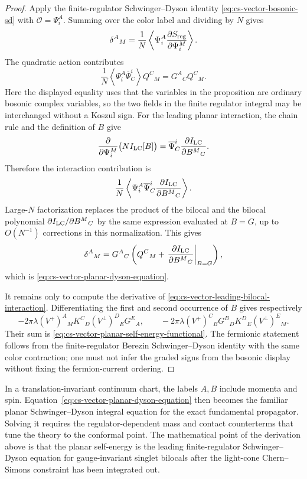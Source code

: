 \begin{proof}
Apply the finite-regulator Schwinger--Dyson identity
\eqref{eq:cs-vector-bosonic-sd} with
\(\mathcal O=\Psi_i^A\).  Summing over the color label and dividing by \(N\)
gives
\[
  \delta^A{}_{M}
  =
  \frac1N
  \left\langle
    \Psi_i^A
    \frac{\partial S_{\rm reg}}{\partial\Psi_i^M}
  \right\rangle .
\]
The quadratic action contributes
\[
  \frac1N
  \left\langle\Psi_i^A\overline\Psi^i_C\right\rangle Q^C{}_{M}
  =
  G^A{}_{C}Q^C{}_{M}.
\]
Here the displayed equality uses that the variables in the proposition are
ordinary bosonic complex variables, so the two fields in the finite
regulator integral may be interchanged without a Koszul sign.
For the leading planar interaction, the chain rule and the definition of
\(B\) give
\[
  \frac{\partial}{\partial\Psi_i^M}
  \bigl(NI_{\rm LC}[B]\bigr)
  =
  \overline\Psi^i_C
  \frac{\partial I_{\rm LC}}{\partial B^M{}_{C}} .
\]
Therefore the interaction contribution is
\[
  \frac1N
  \left\langle
    \Psi_i^A\overline\Psi^i_C
    \frac{\partial I_{\rm LC}}{\partial B^M{}_{C}}
  \right\rangle .
\]
Large-\(N\) factorization replaces the product of the bilocal and the
bilocal polynomial
\(\partial I_{\rm LC}/\partial B^M{}_{C}\) by the same expression evaluated
at \(B=G\), up to \(O(N^{-1})\) corrections in this normalization.  This gives
\[
  \delta^A{}_{M}
  =
  G^A{}_{C}
  \left(
    Q^C{}_{M}
    +
    \left.
    \frac{\partial I_{\rm LC}}{\partial B^M{}_{C}}
    \right|_{B=G}
  \right),
\]
which is \eqref{eq:cs-vector-planar-dyson-equation}.

It remains only to compute the derivative of
\eqref{eq:cs-vector-leading-bilocal-interaction}.  Differentiating the first
and second occurrence of \(B\) gives respectively
\[
  -2\pi\lambda
  (V^+)^A{}_{M}K^C{}_{D}(V^\perp)^D{}_{E}G^E{}_{A},
  \qquad
  -2\pi\lambda
  (V^+)^C{}_{B}G^B{}_{D}K^D{}_{E}(V^\perp)^E{}_{M}.
\]
Their sum is \eqref{eq:cs-vector-planar-self-energy-functional}.  The
fermionic statement follows from the finite-regulator Berezin
Schwinger--Dyson identity with the same color contraction; one must not infer
the graded signs from the bosonic display without fixing the fermion-current
ordering.
\end{proof}

In a translation-invariant continuum chart, the labels \(A,B\) include
momenta and spin.  Equation~\eqref{eq:cs-vector-planar-dyson-equation} then
becomes the familiar planar Schwinger--Dyson integral equation for the exact
fundamental propagator.  Solving it requires the regulator-dependent mass and
contact counterterms that tune the theory to the conformal point.  The
mathematical point of the derivation above is that the planar self-energy is
the leading finite-regulator Schwinger--Dyson equation for gauge-invariant
singlet bilocals after the light-cone Chern--Simons constraint has been
integrated out.


